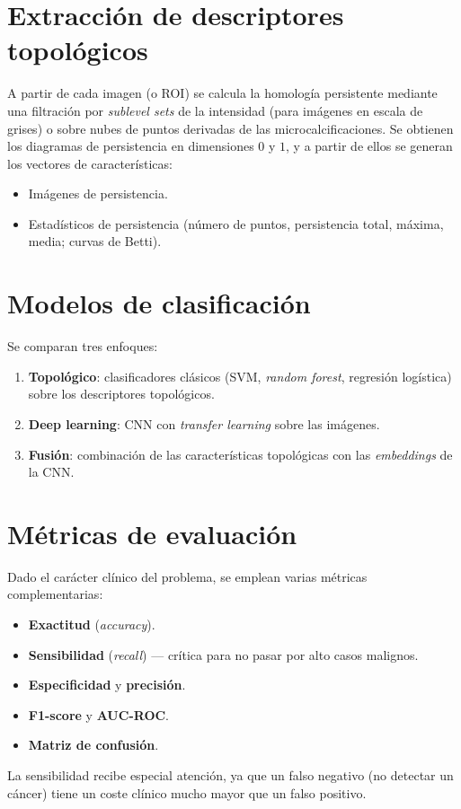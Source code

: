 \section{Extracción de descriptores topológicos}
\label{sec:descriptores-topologicos}
A partir de cada imagen (o ROI) se calcula la homología persistente mediante una
filtración por \textit{sublevel sets} de la intensidad (para imágenes en escala
de grises) o sobre nubes de puntos derivadas de las microcalcificaciones. Se
obtienen los diagramas de persistencia en dimensiones $0$ y $1$, y a partir de
ellos se generan los vectores de características:
\begin{itemize}
  \item Imágenes de persistencia.
  \item Estadísticos de persistencia (número de puntos, persistencia total,
        máxima, media; curvas de Betti).
\end{itemize}

\section{Modelos de clasificación}
Se comparan tres enfoques:
\begin{enumerate}
  \item \textbf{Topológico}: clasificadores clásicos (SVM, \textit{random
        forest}, regresión logística) sobre los descriptores topológicos.
  \item \textbf{Deep learning}: CNN con \textit{transfer learning} sobre las
        imágenes.
  \item \textbf{Fusión}: combinación de las características topológicas con las
        \textit{embeddings} de la CNN.
\end{enumerate}

\section{Métricas de evaluación}
Dado el carácter clínico del problema, se emplean varias métricas
complementarias:
\begin{itemize}
  \item \textbf{Exactitud} (\textit{accuracy}).
  \item \textbf{Sensibilidad} (\textit{recall}) --- crítica para no pasar por
        alto casos malignos.
  \item \textbf{Especificidad} y \textbf{precisión}.
  \item \textbf{F1-score} y \textbf{AUC-ROC}.
  \item \textbf{Matriz de confusión}.
\end{itemize}
La sensibilidad recibe especial atención, ya que un falso negativo (no detectar
un cáncer) tiene un coste clínico mucho mayor que un falso positivo.


